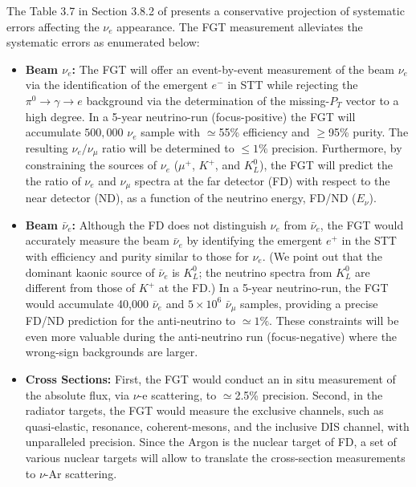 The Table 3.7 
in Section 3.8.2 of \volphys
presents a conservative projection of systematic errors affecting the
$\nu_e$ appearance. The FGT measurement alleviates the systematic
errors as enumerated below:
\begin{itemize}
    \item {\bf Beam $\nu_e$:} The FGT will offer an event-by-event
      measurement of the beam $\nu_e$ via the identification of the
      emergent $e^-$ in STT while rejecting the $\pi^0 \rightarrow
      \gamma \rightarrow e$ background via the determination of the
      missing-$P_T$ vector to a high degree.  In a 5-year neutrino-run
      (focus-positive) the FGT will accumulate $500,000$ $\nu_e$
      sample with $\simeq$55\% efficiency and $\geq$95\% purity.
      The resulting $\nu_e / \nu_\mu$ ratio will be determined to
      $\leq 1\%$ precision. Furthermore, by constraining the sources
      of $\nu_e$ ($\mu^+$, $K^+$, and $K^0_L$), the FGT will predict
      the the ratio of $\nu_e$ and $\nu_\mu$ spectra at the far
      detector (FD) with respect to the near detector (ND), as a
      function of the neutrino energy, FD/ND ($E_\nu$).

    \item {\bf Beam $\bar\nu_e$:} Although the FD does not distinguish
      $\nu_e$ from $\bar\nu_e$, the FGT would accurately measure the
      beam $\bar\nu_e$ by identifying the emergent $e^+$ in the STT
      with efficiency and purity similar to those for $\nu_e$.  (We
      point out that the dominant kaonic source of $\bar\nu_e$ is
      $K^0_L$; the neutrino spectra from $K^0_L$ are different from
      those of $K^+$ at the FD.)  In a 5-year neutrino-run, the FGT
      would accumulate 40,000 $\bar\nu_e$ and $5\times 10^6$
      $\bar\nu_\mu$ samples, providing a precise FD/ND prediction for
      the anti-neutrino to $\simeq 1\%$.  These constraints will be
      even more valuable during the anti-neutrino run (focus-negative)
      where the wrong-sign backgrounds are larger.

    \item {\bf Cross Sections:} First, the FGT would conduct an in
      situ measurement of the absolute flux, via $\nu$-e scattering,
      to $\simeq$2.5\% precision. Second, in the radiator targets,
      the FGT would measure the exclusive channels, such as
      quasi-elastic, resonance, coherent-mesons, and the inclusive DIS
      channel, with unparalleled precision. Since the Argon is the
      nuclear target of FD, a set of various nuclear targets will
      allow to translate the cross-section measurements to $\nu$-Ar
      scattering.


\end{itemize}
